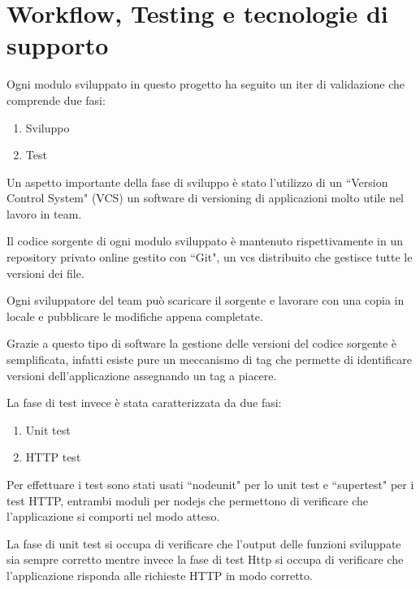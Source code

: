 \chapter{Workflow, Testing e tecnologie di supporto}
Ogni modulo sviluppato in questo progetto ha seguito un iter di validazione che comprende due fasi:
\begin{enumerate}
	\item Sviluppo
	\item Test
\end{enumerate}

Un aspetto importante della fase di sviluppo è stato l'utilizzo di un ``Version Control System" (VCS) un software di versioning di applicazioni molto utile nel lavoro in team. 

Il codice sorgente di ogni modulo sviluppato è mantenuto rispettivamente in un repository privato online gestito con ``Git", un vcs distribuito che gestisce tutte le versioni dei file. 

Ogni sviluppatore del team può scaricare il sorgente e lavorare con una copia in locale e pubblicare le modifiche appena completate. 

Grazie a questo tipo di software la gestione delle versioni del codice sorgente è semplificata, infatti esiste pure un meccanismo di tag che permette di identificare versioni dell'applicazione assegnando un tag a piacere.
\newline

La fase di test invece è stata caratterizzata da due fasi:
\begin{enumerate}
	\item Unit test
	\item HTTP test
\end{enumerate}

Per effettuare i test sono stati usati ``nodeunit" per lo unit test e ``supertest" per i test HTTP, entrambi moduli per nodejs che permettono di verificare che l'applicazione si comporti nel modo atteso. 

La fase di unit test si occupa di verificare che l'output delle funzioni sviluppate sia sempre corretto mentre invece la fase di test Http si occupa di verificare che l'applicazione risponda alle richieste HTTP in modo corretto.

